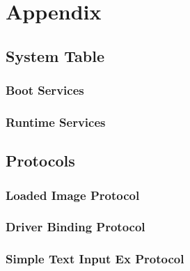 
\chapter{Appendix}

\section{System Table}

\clearpage

\subsection{Boot Services}

\clearpage

\subsection{Runtime Services}

\clearpage

\section{Protocols}

\subsection{Loaded Image Protocol}


\clearpage

\subsection{Driver Binding Protocol}


\clearpage

\subsection{Simple Text Input Ex Protocol}


